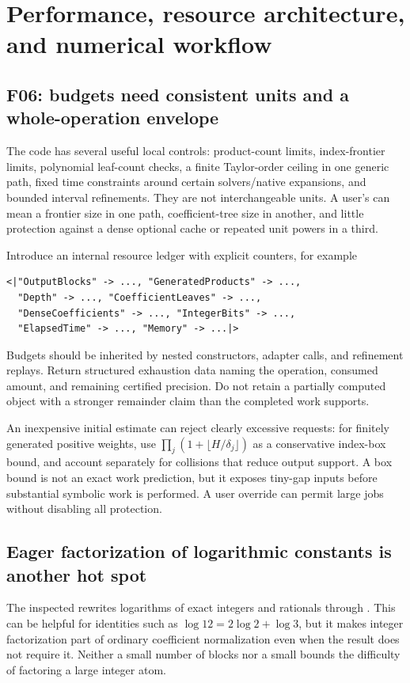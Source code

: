 \documentclass[11pt,a4paper]{article}
\newcommand{\code}[1]{\texttt{\detokenize{#1}}}
\begin{document}
\section{Performance, resource architecture, and numerical workflow}\label{sec:performance}

\subsection{F06: budgets need consistent units and a whole-operation envelope}
The code has several useful local controls: product-count limits, index-frontier limits, polynomial leaf-count checks, a finite Taylor-order ceiling in one generic path, fixed time constraints around certain solvers/native expansions, and bounded interval refinements. They are not interchangeable units. A user's \code{MaxTerms -> 1000} can mean a frontier size in one path, coefficient-tree size in another, and little protection against a dense optional cache or repeated unit powers in a third.\cite{repo-main,repo-incremental,repo-gamma,repo-native,repo-certificate}

Introduce an internal resource ledger with explicit counters, for example
\begin{lstlisting}
<|"OutputBlocks" -> ..., "GeneratedProducts" -> ...,
  "Depth" -> ..., "CoefficientLeaves" -> ...,
  "DenseCoefficients" -> ..., "IntegerBits" -> ...,
  "ElapsedTime" -> ..., "Memory" -> ...|>
\end{lstlisting}
Budgets should be inherited by nested constructors, adapter calls, and refinement replays. Return structured exhaustion data naming the operation, consumed amount, and remaining certified precision. Do not retain a partially computed object with a stronger remainder claim than the completed work supports.

An inexpensive initial estimate can reject clearly excessive requests: for finitely generated positive weights, use \(\prod_j(1+\lfloor H/\delta_j\rfloor)\) as a conservative index-box bound, and account separately for collisions that reduce output support. A box bound is not an exact work prediction, but it exposes tiny-gap inputs before substantial symbolic work is performed. A user override can permit large jobs without disabling all protection.

\subsection{Eager factorization of logarithmic constants is another hot spot}
The inspected \code{logCanon} rewrites logarithms of exact integers and rationals through \code{FactorInteger}. This can be helpful for identities such as \(\log 12=2\log2+\log3\), but it makes integer factorization part of ordinary coefficient normalization even when the result does not require it. Neither a small number of blocks nor a small \code{LeafCount} bounds the difficulty of factoring a large integer atom.\cite{repo-main}
\end{document}

